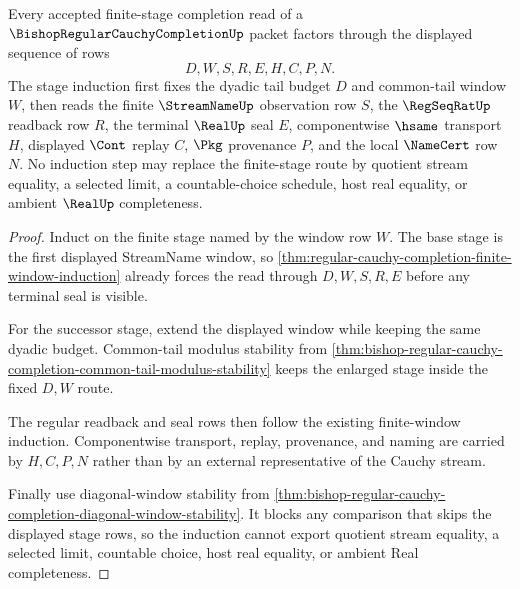 \begin{theorem}
\label{thm:bishop-regular-cauchy-completion-finite-stage-induction}
Every accepted finite-stage completion read of a $\BishopRegularCauchyCompletionUp$ packet factors through the displayed sequence of rows
$$
D,W,S,R,E,H,C,P,N.
$$
The stage induction first fixes the dyadic tail budget $D$ and common-tail window $W$, then reads the finite $\StreamNameUp$ observation row $S$, the $\RegSeqRatUp$ readback row $R$, the terminal $\RealUp$ seal $E$, componentwise $\hsame$ transport $H$, displayed $\Cont$ replay $C$, $\Pkg$ provenance $P$, and the local $\NameCert$ row $N$. No induction step may replace the finite-stage route by quotient stream equality, a selected limit, a countable-choice schedule, host real equality, or ambient $\RealUp$ completeness.
\end{theorem}
\begin{proof}
Induct on the finite stage named by the window row $W$. The base stage is the first displayed StreamName window, so \autoref{thm:regular-cauchy-completion-finite-window-induction} already forces the read through $D,W,S,R,E$ before any terminal seal is visible.

For the successor stage, extend the displayed window while keeping the same dyadic budget. Common-tail modulus stability from \autoref{thm:bishop-regular-cauchy-completion-common-tail-modulus-stability} keeps the enlarged stage inside the fixed $D,W$ route.

The regular readback and seal rows then follow the existing finite-window induction. Componentwise transport, replay, provenance, and naming are carried by $H,C,P,N$ rather than by an external representative of the Cauchy stream.

Finally use diagonal-window stability from \autoref{thm:bishop-regular-cauchy-completion-diagonal-window-stability}. It blocks any comparison that skips the displayed stage rows, so the induction cannot export quotient stream equality, a selected limit, countable choice, host real equality, or ambient Real completeness.
\end{proof}

